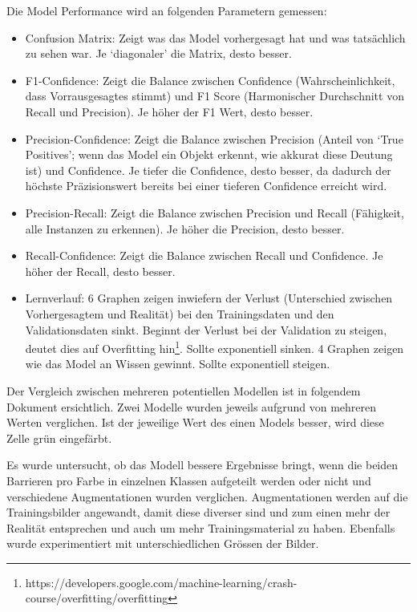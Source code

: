 Die Model Performance wird an folgenden Parametern gemessen:\cite{model-performance}

\begin{itemize}
    \item Confusion Matrix: Zeigt was das Model vorhergesagt hat und was tatsächlich zu sehen war. Je `diagonaler' die Matrix, desto besser.
    \item F1-Confidence: Zeigt die Balance zwischen Confidence (Wahrscheinlichkeit, dass Vorrausgesagtes stimmt) und F1 Score (Harmonischer Durchschnitt von Recall und Precision). Je höher der F1 Wert, desto besser.
    \item Precision-Confidence: Zeigt die Balance zwischen Precision (Anteil von `True Positives'; wenn das Model ein Objekt erkennt, wie akkurat diese Deutung ist) und Confidence. Je tiefer die Confidence, desto besser, da dadurch der höchste Präzisionswert bereits bei einer tieferen Confidence erreicht wird.
    \item Precision-Recall: Zeigt die Balance zwischen Precision und Recall (Fähigkeit, alle Instanzen zu erkennen). Je höher die Precision, desto besser.
    \item Recall-Confidence: Zeigt die Balance zwischen Recall und Confidence. Je höher der Recall, desto besser.
    \item Lernverlauf: 6 Graphen zeigen inwiefern der Verlust (Unterschied zwischen Vorhergesagtem und Realität) bei den Trainingsdaten und den Validationsdaten sinkt. Beginnt der Verlust bei der Validation zu steigen, deutet dies auf Overfitting hin\footnote{https://developers.google.com/machine-learning/crash-course/overfitting/overfitting}. Sollte exponentiell sinken. 4 Graphen zeigen wie das Model an Wissen gewinnt. Sollte exponentiell steigen.
\end{itemize}


Der Vergleich zwischen mehreren potentiellen Modellen ist in folgendem Dokument ersichtlich. Zwei Modelle wurden jeweils aufgrund von mehreren Werten verglichen. Ist der jeweilige Wert des einen Models besser, wird diese Zelle grün eingefärbt.

Es wurde untersucht, ob das Modell bessere Ergebnisse bringt, wenn die beiden Barrieren pro Farbe in einzelnen Klassen aufgeteilt werden oder nicht und verschiedene Augmentationen wurden verglichen. Augmentationen werden auf die Trainingsbilder angewandt, damit diese diverser sind und zum einen mehr der Realität entsprechen und auch um mehr Trainingsmaterial zu haben. Ebenfalls wurde experimentiert mit unterschiedlichen Grössen der Bilder. 

